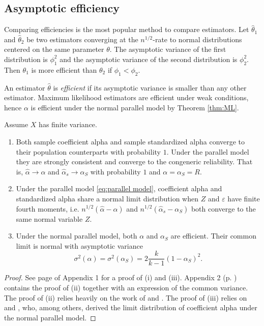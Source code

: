 \documentclass[twoside]{article}
\begin{document}
\subsection{Asymptotic efficiency}
Comparing efficiencies is the most popular method to compare estimators. Let $\hat{\theta}_1$ and $\hat{\theta}_2$ be two estimators converging at the $n^{1/2}$-rate to normal distributions centered on the same parameter $\theta$. The asymptotic variance of the first distribution is $\phi_1^2$ and the asymptotic variance of the second distribution is $\phi_2^2$. Then $\theta_1$ is more efficient than $\theta_2$ if $\phi_1<\phi_2$. 

An estimator $\hat{\theta}$ is \textit{efficient} \citep[][Section 4.3]{Lehmann2004-ke} if its asymptotic variance is smaller than any other estimator. Maximum likelihood estimators are efficient under weak conditions, hence $\alpha$ is efficient under the normal parallel model by Theorem \ref{thm:ML}.  

\begin{thm}
\label{thm:asymptotics}
Assume $X$ has finite variance. 
\begin{enumerate}[label=(\roman*)]
    \item Both sample coefficient alpha and sample standardized alpha converge to their population counterparts with probability $1$. Under the parallel model they are strongly consistent and converge to the congeneric reliability. That is, $\hat{\alpha}\to\alpha$ and $\hat{\alpha}_s\to\alpha_S$ with probability $1$ and $\alpha = \alpha_S =  R$.
    \item Under the parallel model \eqref{eq:parallel model}, coefficient alpha and standardized alpha share a normal limit distribution when $Z$ and $\varepsilon$ have finite fourth moments, i.e. $n^{1/2}(\hat{\alpha} - \alpha)$ and  $n^{1/2}(\hat{\alpha}_s - \alpha_S)$ both converge to the same normal variable $Z$.
    \item Under the normal parallel model, both $\alpha$ and $\alpha_S$ are efficient. Their common limit is normal with asymptotic variance 
    $$\sigma^{2}(\alpha)= \sigma^{2}(\alpha_S)=2\frac{k}{k-1}(1-\alpha_S)^{2}.$$
\end{enumerate}
\end{thm}    
\begin{proof}
See page \pageref{proof:asymptotics} of Appendix 1 for a proof of (i) and (iii). Appendix 2 (p. \pageref{Appendix 2}) contains the proof of (ii) together with an expression of the common variance. The proof of (ii) relies heavily on the work of \citet{Van_Zyl2000-si} and \citet{hayashi2005note}. The proof of (iii) relies on \citet[][eq. 13]{Van_Zyl2000-si} and \citet[][eq. 58]{Kristof1963-tb}, who, among others, derived the limit distribution of coefficient alpha under the normal parallel model.
\end{proof}
\end{document}
